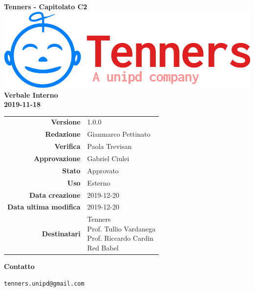 \begin{titlepage}
	\begin{center}
		\large \textbf{Tenners - Capitolato C2}
		\vfill
		\includegraphics[scale = 0.3]{./res/img/logo.png}\\
		\vfill
		\Huge \textbf{Verbale Interno} \\
		\textbf {2019-11-18}

        \vfill
        \large

        \begin{tabular}{r|l}
                        \textbf{Versione} & 1.0.0 \\
                        \textbf{Redazione} & Gianmarco Pettinato \\
                        \textbf{Verifica} &  Paola Trevisan \\
                        \textbf{Approvazione} & Gabriel Ciulei \\
                        \textbf{Stato} & Approvato \\
                        \textbf{Uso} &  Esterno\\
                        \textbf{Data creazione} &  2019-12-20\\
                        \textbf{Data ultima modifica} &  2019-12-20\\
                        \textbf{Destinatari} & \parbox[t]{5cm}{Tenners \\ Prof. Tullio Vardanega\\ Prof. Riccardo Cardin \\ Red Babel}
                \end{tabular}
                \vfill
                \normalsize
                \vfill
                \textbf{Contatto}
                
                \texttt{tenners.unipd@gmail.com}

	\end{center}
\end{titlepage}
